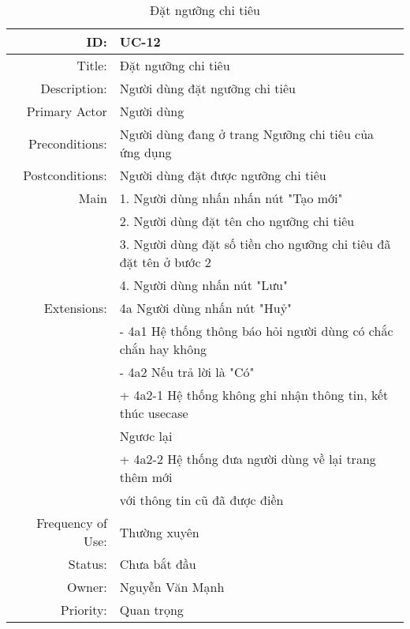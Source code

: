 \documentclass[a4paper,10pt]{article}
\begin{document}
\newpage
\begin{table}[ht]
 \centering
 \caption{Đặt ngưỡng chi tiêu} 
 \begin{tabular}{| r | l |}

  \hline 
  ID:  & UC-12 \\ \hline  
  Title:  & Đặt ngưỡng chi tiêu  \\ \hline
  Description: & Người dùng đặt ngưỡng chi tiêu  \\ \hline
  Primary Actor & Người dùng  \\ \hline
  Preconditions:  & Người dùng đang ở trang Ngưỡng chi tiêu của ứng dụng \\ \hline
  Postconditions: & Người dùng đặt được ngưỡng chi tiêu \\ \hline
    Main & {1}. Người dùng nhấn nhấn nút "Tạo mới"\\
       & {2}. Người dùng đặt tên cho ngưỡng chi tiêu  \\ 
       & {3}. Người dùng đặt số tiền cho ngưỡng chi tiêu đã đặt tên ở bước 2 \\
       & {4}. Người dùng nhấn nút "Lưu"  \\ \hline
  Extensions: & {4a} Người dùng nhấn nút "Huỷ"  \\ \hline
       & \hspace{3mm} - {4a1} Hệ thống thông báo hỏi người dùng có chắc chắn hay không  \\ 
       & \hspace{3mm} - {4a2} Nếu trả lời là "Có"  \\
       & \hspace{15mm} + {4a2-1} Hệ thống không ghi nhận thông tin, kết thúc usecase  \\ 
       & \hspace{12mm}   Ngươc lại   \\
       & \hspace{15mm} + {4a2-2} Hệ thống đưa người dùng về lại trang thêm mới \\
       & \hspace{28mm}  với thông tin cũ đã được điền  \\
  \hline
  Frequency of Use: & Thường xuyên  \\ \hline
  Status: & Chưa bắt đầu  \\ \hline
  Owner: & Nguyễn Văn Mạnh  \\ \hline
  Priority: & Quan trọng \\
  \hline 
 \end{tabular}

\end{table}
\end{document}
